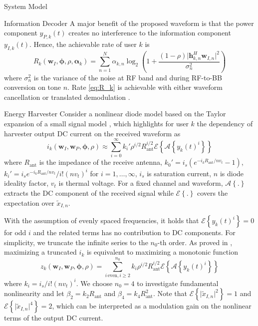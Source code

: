 \documentclass{IEEEtran}
\begin{document}
\begin{section}{System Model}
	\begin{subsection}{Information Decoder}
		A major benefit of the proposed waveform is that the power component $y_{P,k}(t)$ creates no interference to the information component $y_{I,k}(t)$. Hence, the achievable rate of user $k$ is
		\begin{equation}\label{eq:R_k}
			R_k(\boldsymbol{w}_I,\boldsymbol{\phi},\rho,\boldsymbol{\alpha}_k)=\sum_{n=1}^N\alpha_{k,n}{\log_2\left(1+\frac{(1-\rho)\lvert \boldsymbol{h}_{k,n}^H\boldsymbol{w}_{I,n} \rvert^2}{\sigma_n^2}\right)}
		\end{equation}
		where $\sigma_n^2$ is the variance of the noise at RF band and during RF-to-BB conversion on tone $n$. Rate \ref{eq:R_k} is achievable with either waveform cancellation or translated demodulation \cite{Clerckx2018b}.
	\end{subsection}

	\begin{subsection}{Energy Harvester}
		Consider a nonlinear diode model based on the Taylor expansion of a small signal model \cite{Clerckx2016a,Clerckx2018b}, which highlights for user $k$ the dependency of harvester output DC current on the received waveform as
		\begin{equation}\label{eq:i_k}
			i_k(\boldsymbol{w}_I,\boldsymbol{w}_P,\boldsymbol{\phi},\rho)\approx\sum_{i=0}^{\infty}{k_i'}{\rho^{i/2}}{R_{\text{ant}}^{i/2}}\mathcal{E}\left\{{\mathcal{A}\left\{y_k(t)^i\right\}}\right\}
		\end{equation}
		where $R_{\text{ant}}$ is the impedance of the receive antenna, $k_0'=i_s(e^{-i_kR_{\text{ant}}/nv_t}-1)$, $k_i'=i_se^{-i_kR_{\text{ant}}/nv_t}/i!(nv_t)^i$ for $i=1,\dots,\infty$, $i_s$ is saturation current, $n$ is diode ideality factor, $v_t$ is thermal voltage. For a fixed channel and waveform, $\mathcal{A}\left\{.\right\}$ extracts the DC component of the received signal while $\mathcal{E}\left\{.\right\}$ covers the expectation over $\tilde{x}_{I,n}$.

		With the assumption of evenly spaced frequencies, it holds that $\mathcal{E}\left\{y_k(t)^i\right\}=0$ for odd $i$ and the related terms has no contribution to DC components. For simplicity, we truncate the infinite series to the $n_0$-th order. As proved in \cite{Clerckx2016a}, maximizing a truncated $i_k$ is equivalent to maximizing a monotonic function
		\begin{equation}\label{eq:z_k}
			z_k(\boldsymbol{w}_I,\boldsymbol{w}_P,\boldsymbol{\phi},\rho)=\sum_{i\,\text{even},i\ge2}^{n_0}{k_i}{\rho^{i/2}}{R_{\text{ant}}^{i/2}}{\mathcal{E}\left\{\mathcal{A}\left\{y_k(t)^i\right\}\right\}}
		\end{equation}
		where $k_i=i_s/i!(nv_t)^i$. We choose $n_0=4$ to investigate fundamental nonlinearity and let $\beta_2={k_2}{R_{\text{ant}}}$ and $\beta_4={k_4}{R_{\text{ant}}^2}$. Note that $\mathcal{E}\left\{\lvert\tilde{x}_{I,n}\rvert^2\right\}=1$ and $\mathcal{E}\left\{\lvert\tilde{x}_{I,n}\rvert^4\right\}=2$, which can be interpreted as a modulation gain on the nonlinear terms of the output DC current.


\end{subsection}
\end{section}
\end{document}
